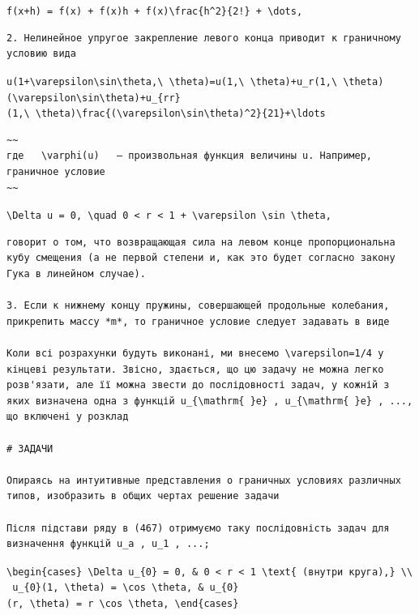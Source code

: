 \documentclass[
  ukrainian,
]{article}
\begin{document}
\texttt{f(x+h)\ =\ f(x)\ +\ f\textquotesingle{}(x)h\ +\ f\textquotesingle{}\textquotesingle{}(x)\textbackslash{}frac\{h\^{}2\}\{2!\}\ +\ \textbackslash{}dots,}

\begin{verbatim}
2. Нелинейное упругое закрепление левого конца приводит к граничному условию вида
\end{verbatim}

\texttt{u(1+\textbackslash{}varepsilon\textbackslash{}sin\textbackslash{}theta,\textbackslash{}\ \textbackslash{}theta)=u(1,\textbackslash{}\ \textbackslash{}theta)+u\_r(1,\textbackslash{}\ \textbackslash{}theta)(\textbackslash{}varepsilon\textbackslash{}sin\textbackslash{}theta)+u\_\{rr\}(1,\textbackslash{}\ \textbackslash{}theta)\textbackslash{}frac\{(\textbackslash{}varepsilon\textbackslash{}sin\textbackslash{}theta)\^{}2\}\{21\}+\textbackslash{}ldots}

\begin{verbatim}
~~
где   \varphi(u)   — произвольная функция величины u. Например, граничное условие
~~
\end{verbatim}

\texttt{\textbackslash{}Delta\ u\ =\ 0,\ \textbackslash{}quad\ 0\ \textless{}\ r\ \textless{}\ 1\ +\ \textbackslash{}varepsilon\ \textbackslash{}sin\ \textbackslash{}theta,}

\begin{verbatim}
говорит о том, что возвращающая сила на левом конце пропорциональна кубу смещения (а не первой степени и, как это будет согласно закону Гука в линейном случае).

3. Если к нижнему концу пружины, совершающей продольные колебания, прикрепить массу *m*, то граничное условие следует задавать в виде

Коли всі розрахунки будуть виконані, ми внесемо \varepsilon=1/4 у кінцеві результати. Звісно, здається, що цю задачу не можна легко розв'язати, але її можна звести до послідовності задач, у кожній з яких визначена одна з функцій u_{\mathrm{ }e} , u_{\mathrm{ }e} , ..., що включені у розклад

# ЗАДАЧИ

Опираясь на интуитивные представления о граничных условиях различных типов, изобразить в общих чертах решение задачи

Після підстави ряду в (467) отримуємо таку послідовність задач для визначення функцій u_a , u_1 , ...;
\end{verbatim}

\texttt{\textbackslash{}begin\{cases\}\ \textbackslash{}Delta\ u\_\{0\}\ =\ 0,\ \&\ 0\ \textless{}\ r\ \textless{}\ 1\ \textbackslash{}text\{\ (внутри\ круга),\}\ \textbackslash{}\textbackslash{}\ u\_\{0\}(1,\ \textbackslash{}theta)\ =\ \textbackslash{}cos\ \textbackslash{}theta,\ \&\ u\_\{0\}(r,\ \textbackslash{}theta)\ =\ r\ \textbackslash{}cos\ \textbackslash{}theta,\ \textbackslash{}end\{cases\}}
\end{document}
